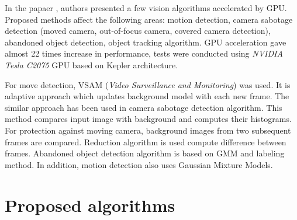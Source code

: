 \documentclass[b5paper,10pt,twoside]{article}
\begin{document}
{In the papaer \cite{Guler_2016}, authors presented a few vision algorithms accelerated by GPU. Proposed methods affect the following areas: motion detection, camera sabotage detection (moved camera, out-of-focus camera, covered camera detection), abandoned object detection, object tracking algorithm. GPU acceleration gave almost 22 times increase in performance, tests were conducted using \textit{NVIDIA Tesla C2075} GPU based on Kepler architecture. 

For move detection, VSAM (\textit{Video Surveillance and Monitoring}) was used. It is adaptive approach which updates background model with each new frame. The similar approach has been used in camera sabotage detection algorithm. This method compares input image with background and computes their histograms. For protection against moving camera, background images from two subsequent frames are compared. Reduction algorithm is used compute difference between frames. Abandoned object detection algorithm is based on GMM and labeling method. In addition, motion detection also uses Gaussian Mixture Models.




\section{Proposed algorithms}
\label{sec:algorithms}

}
\end{document}

